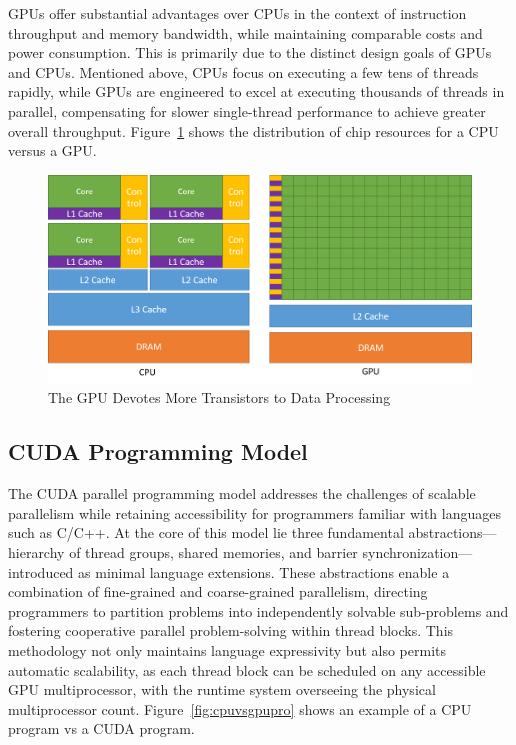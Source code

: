 GPUs offer substantial advantages over CPUs in the context of instruction throughput and memory bandwidth, 
while maintaining comparable costs and power consumption. This is primarily due to the distinct design 
goals of GPUs and CPUs. Mentioned above, CPUs focus on executing a few tens of threads rapidly, while GPUs are engineered 
to excel at executing thousands of threads in parallel, compensating for slower single-thread performance 
to achieve greater overall throughput. Figure~\ref{fig:gpuvscpu} shows the distribution of chip resources 
for a CPU versus a GPU.

\begin{figure}[htb]
    \centering
    \includegraphics[width=0.65\linewidth]{Figures/gpu-devotes-more-transistors-to-data-processing.png}
	\caption{The GPU Devotes More Transistors to Data Processing}
	\label{fig:gpuvscpu}
\end{figure}

\subsection{CUDA Programming Model}
\label{sec:cudapromodel}
The CUDA parallel programming model addresses the challenges of scalable parallelism\cite{marccudaslides} while retaining 
accessibility for programmers familiar with languages such as C/C++. At the core of this model lie three 
fundamental abstractions—hierarchy of thread groups, shared memories, and barrier 
synchronization—introduced as minimal language extensions. These abstractions enable a combination of 
fine-grained and coarse-grained parallelism, directing programmers to partition problems into independently 
solvable sub-problems and fostering cooperative parallel problem-solving within thread blocks. 
This methodology not only maintains language expressivity but also permits automatic scalability, as each 
thread block can be scheduled on any accessible GPU multiprocessor, with the runtime system overseeing 
the physical multiprocessor count\cite{cuda2016best}. Figure~\ref{fig:cpuvsgpupro} shows an example of a CPU program vs a CUDA program.

